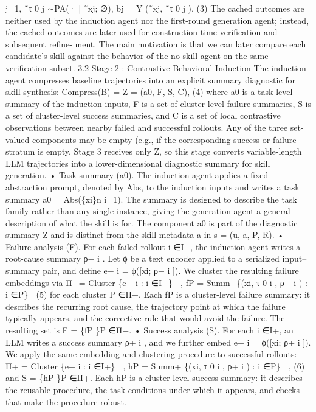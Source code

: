 j=1,
˜τ 0
j ∼PA(· | ˜xj; ∅),
bj = Y (˜xj, ˜τ 0
j ).
(3)
The cached outcomes are neither used by the induction agent nor the first-round generation agent;
instead, the cached outcomes are later used for construction-time verification and subsequent refine-
ment. The main motivation is that we can later compare each candidate’s skill against the behavior of
the no-skill agent on the same verification subset.
3.2
Stage 2 : Contrastive Behavioral Induction
The induction agent compresses baseline trajectories into an explicit summary diagnostic for skill
synthesis:
Compress(B) = Z = (a0, F, S, C),
(4)
where a0 is a task-level summary of the induction inputs, F is a set of cluster-level failure summaries,
S is a set of cluster-level success summaries, and C is a set of local contrastive observations between
nearby failed and successful rollouts. Any of the three set-valued components may be empty (e.g., if
the corresponding success or failure stratum is empty. Stage 3 receives only Z, so this stage converts
variable-length LLM trajectories into a lower-dimensional diagnostic summary for skill generation.
• Task summary (a0). The induction agent applies a fixed abstraction prompt, denoted by Abs,
to the induction inputs and writes a task summary a0 = Abs(\{xi\}n
i=1). The summary is designed
to describe the task family rather than any single instance, giving the generation agent a general
description of what the skill is for. The component a0 is part of the diagnostic summary Z and is
distinct from the skill metadata a in s = (u, a, P, R).
• Failure analysis (F). For each failed rollout i ∈I−, the induction agent writes a root-cause
summary ρ−
i . Let ϕ be a text encoder applied to a serialized input–summary pair, and define
e−
i = ϕ([xi; ρ−
i ]). We cluster the resulting failure embeddings via
Π−= Cluster
 \{e−
i : i ∈I−\}

,
fP = Summ− \{(xi, τ 0
i , ρ−
i ) : i ∈P\}

(5)
for each cluster P ∈Π−. Each fP is a cluster-level failure summary: it describes the recurring root
cause, the trajectory point at which the failure typically appears, and the corrective rule that would
avoid the failure. The resulting set is F = \{fP \}P ∈Π−.
• Success analysis (S). For each i ∈I+, an LLM writes a success summary ρ+
i , and we further
embed e+
i = ϕ([xi; ρ+
i ]). We apply the same embedding and clustering procedure to successful
rollouts:
Π+ = Cluster
 \{e+
i : i ∈I+\}

,
hP = Summ+  \{(xi, τ 0
i , ρ+
i ) : i ∈P\}

,
(6)
and S = \{hP \}P ∈Π+. Each hP is a cluster-level success summary: it describes the reusable procedure,
the task conditions under which it appears, and checks that make the procedure robust.
